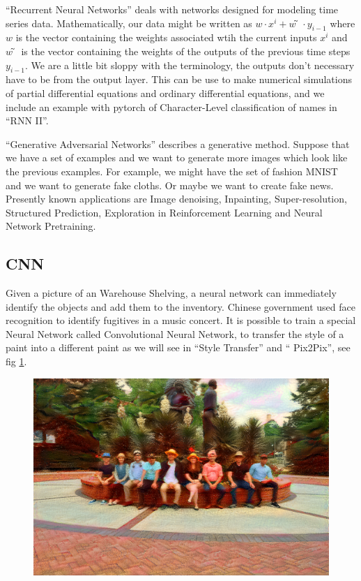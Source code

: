 \documentclass[11pt,letterpaper]{report}
\begin{document}
    ``Recurrent Neural Networks'' deals with networks designed for modeling time series data.  Mathematically, our data might be written as $w⋅x^i+w̃ ⋅y_{i−1}$ where  $w$  is the vector containing the weights associated wtih the current inputs  $x^i$  and  $w̃$  is the vector containing the weights of the outputs of the previous time steps  $y_{i−1}$. We are a little bit sloppy with the terminology, the outputs don't necessary have to be from the output layer.
This can be use to make numerical simulations of partial differential equations and ordinary differential equations, and we include an example with pytorch of Character-Level classification of names in ``RNN II''.

    ``Generative Adversarial Networks'' describes a generative method. Suppose that we have a set of examples and we want to generate more images which look like the previous examples. For example, we might have the set of fashion MNIST and we want to generate fake cloths. Or maybe we want to create fake news. Presently known applications are Image denoising, Inpainting, Super-resolution, Structured Prediction, Exploration in Reinforcement Learning and Neural Network Pretraining.

	\subsection{CNN}
	
	Given a picture of an Warehouse Shelving, a  neural network can immediately identify the objects and add them to the inventory. Chinese government used face recognition to identify fugitives in a music concert. It is possible to train a special Neural Network called Convolutional Neural Network, to transfer the style of a paint into a different paint as we will see in ``Style Transfer'' and `` Pix2Pix'', see fig \ref{fig:botero}. 
	
	
	\begin{figure}[h!]
		\centering
		\includegraphics[width=0.45\linewidth]{figures/botero.png}
		\caption{}
		\label{fig:botero}
	\end{figure} 	
	
\end{document}
